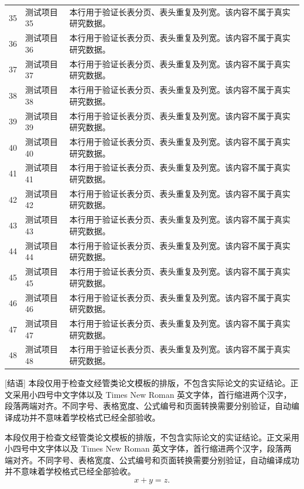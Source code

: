 \documentclass{whcthesis}
\newcommand\demopar{本段仅用于检查文经管类论文模板的排版，不包含实际论文的实证结论。正文采用小四号中文字体以及 Times New Roman 英文字体，首行缩进两个汉字，段落两端对齐。不同字号、表格宽度、公式编号和页面转换需要分别验证，自动编译成功并不意味着学校格式已经全部验收。}
\begin{document}
\begin{longtable}{@{}p{.13\linewidth}p{.29\linewidth}p{}@{}}
35&测试项目35&本行用于验证长表分页、表头重复及列宽。该内容不属于真实研究数据。\\
36&测试项目36&本行用于验证长表分页、表头重复及列宽。该内容不属于真实研究数据。\\
37&测试项目37&本行用于验证长表分页、表头重复及列宽。该内容不属于真实研究数据。\\
38&测试项目38&本行用于验证长表分页、表头重复及列宽。该内容不属于真实研究数据。\\
39&测试项目39&本行用于验证长表分页、表头重复及列宽。该内容不属于真实研究数据。\\
40&测试项目40&本行用于验证长表分页、表头重复及列宽。该内容不属于真实研究数据。\\
41&测试项目41&本行用于验证长表分页、表头重复及列宽。该内容不属于真实研究数据。\\
42&测试项目42&本行用于验证长表分页、表头重复及列宽。该内容不属于真实研究数据。\\
43&测试项目43&本行用于验证长表分页、表头重复及列宽。该内容不属于真实研究数据。\\
44&测试项目44&本行用于验证长表分页、表头重复及列宽。该内容不属于真实研究数据。\\
45&测试项目45&本行用于验证长表分页、表头重复及列宽。该内容不属于真实研究数据。\\
46&测试项目46&本行用于验证长表分页、表头重复及列宽。该内容不属于真实研究数据。\\
47&测试项目47&本行用于验证长表分页、表头重复及列宽。该内容不属于真实研究数据。\\
48&测试项目48&本行用于验证长表分页、表头重复及列宽。该内容不属于真实研究数据。\\
\end{longtable}\endgroup
{}[结语]
\demopar
\begin{whcreferences}
\end{whcreferences}
\WhcAcknowledgements
\WhcAppendices
{}
\demopar
\begin{equation}\label{eq:appendix}x+y=z.\end{equation}
\end{document}
